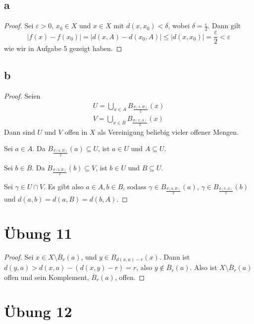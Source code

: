 \documentclass[10pt,a4paper]{article}
\begin{document}
\subsection*{a}

\begin{proof}
Sei $\varepsilon > 0$, $x_{0} \in X$ und $x \in X$ mit $d(x, x_{0}) < \delta$, wobei $\delta = \frac{\varepsilon}{2}$.
Dann gilt
\begin{equation}
|f(x) - f(x_{0})| = |d(x, A) - d(x_{0}, A)| \le |d(x, x_{0})| = \frac{\varepsilon}{2} < \varepsilon
\end{equation}
wie wir in Aufgabe 5 gezeigt haben.
\end{proof}

\subsection*{b}

\begin{proof}
Seien
\begin{align*}
U = \bigcup_{x \in A} B_{\frac{d(x, B)}{2}}(x)\\
V = \bigcup_{x \in B} B_{\frac{d(x, A)}{2}}(x)
\end{align*}
Dann sind $U$ und $V$ offen in $X$ als Vereinigung beliebig vieler offener Mengen.

Sei $a \in A$.
Da $B_{\frac{d(a, B)}{2}}(a) \subseteq U$, ist $a \in U$ und $A \subseteq U$.

Sei $b \in B$.
Da $B_{\frac{d(b, B)}{2}}(b) \subseteq V$, ist $b \in U$ und $B \subseteq U$.

Sei $\gamma \in U \cap V$.
Es gibt also $a \in A, b \in B$, sodass $\gamma \in B_{\frac{d(a, B)}{2}}(a)$, $\gamma \in B_{\frac{d(b, A)}{2}}(b)$ und $d(a, b) = d(a, B) = d(b, A)$.

\end{proof}

\section*{Übung 11}

\begin{proof}
Sei $x \in X \setminus \overline{B}_{r}(a)$, und $y \in B_{d(x, a) - r}(x)$.
Dann ist $d(y, a) > d(x, a) - (d(x, y) - r) = r$, also $y \notin \overline{B}_{r}(a)$.
Also ist $X \setminus \overline{B}_{r}(a)$ offen und sein Komplement, $\overline{B}_{r}(a)$, offen.
\end{proof}

\section*{Übung 12}
\end{document}
